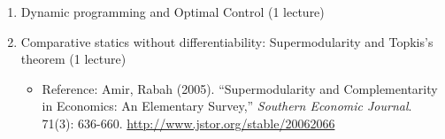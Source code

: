 \documentclass[10pt]{article}
\begin{document}
\begin{enumerate}
\begin{enumerate}
  \end{enumerate}
\item Dynamic programming and Optimal Control (1 lecture) 
\item Comparative statics without differentiability: Supermodularity
  and Topkis's theorem (1 lecture)
  \begin{itemize}
  \item Reference: Amir, Rabah (2005). ``Supermodularity and
    Complementarity in Economics: An Elementary Survey,''
    \textit{Southern Economic Journal}. 71(3):
    636-660. \url{http://www.jstor.org/stable/20062066}
  \end{itemize}
\end{enumerate}
\end{document}
